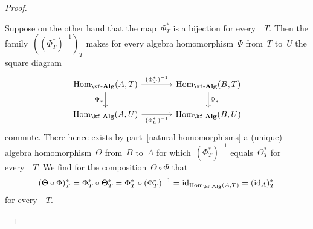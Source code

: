 \begin{proof}
\begin{enumerate}
      Suppose on the other hand that the map~$\Phi^*_T$ is a bijection for every~{\algebra{$\kf$}}~$T$.
      Then the family~$( (\Phi^*_T)^{-1} )_T$ makes for every algebra homomorphism~$\Psi$ from~$T$ to~$U$ the square diagram
      \[
        \begin{tikzcd}[column sep = large]
          \Hom_{\cAlg{\kf}}(A,T)
          \arrow{r}[above]{ (\Phi^*_T)^{-1} }
          \arrow{d}[left]{\Psi_*}
          &
          \Hom_{\cAlg{\kf}}(B,T)
          \arrow{d}[right]{\Psi_*}
          \\
          \Hom_{\cAlg{\kf}}(A,U)
          \arrow{r}[below]{ (\Phi^*_U)^{-1} }
          &
          \Hom_{\cAlg{\kf}}(B,U)
        \end{tikzcd}
      \]
      commute.
      There hence exists by part~\ref*{natural homomorphisms} a (unique) algebra homomorphism~$\Theta$ from~$B$ to~$A$ for which~$(\Phi^*_T)^{-1}$ equals~$\Theta^*_T$ for every~{\algebra{$\kf$}}~$T$.
      We find for the composition~$\Theta \circ \Phi$ that
      \[
        (\Theta \circ \Phi)^*_T
        =
        \Phi^*_T \circ \Theta^*_T
        =
        \Phi^*_T \circ (\Phi^*_T)^{-1}
        =
        \id_{\Hom_{\cAlg{\kf}}(A,T)}
        =
        (\id_A)^*_T
      \]
      for every~{\algebra{$\kf$}}~$T$.

\end{enumerate}
\end{proof}
